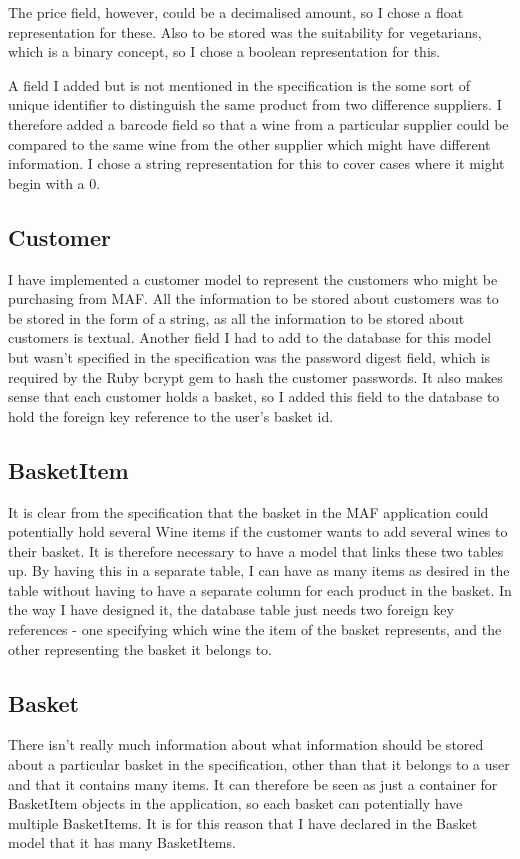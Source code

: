 \documentclass[a4paper,12pt,hidelinks]{report}
\begin{document}
    The price field, however, could be a decimalised amount, so I chose a float representation for these. Also to be stored was the suitability for vegetarians, which 
    is a binary concept, so I chose a boolean representation for this. 
    
    A field I added but is not mentioned in the specification is the some sort of unique identifier to distinguish the same product from
    two difference suppliers. I therefore added a barcode field so that a wine from a particular supplier could be compared to the same wine from the other
    supplier which might have different information. I chose a string representation for this to cover cases where it might begin with a 0.

    \subsection{Customer}
    I have implemented a customer model to represent the customers who might be purchasing from MAF. All the information to be stored about customers was
    to be stored in the form of a string, as all the information to be stored about customers is textual. Another field I had to add to the database for this
    model but wasn't specified in the specification was the password digest field, which is required by the Ruby bcrypt gem to hash the customer passwords.
    It also makes sense that each customer holds a basket, so I added this field to the database to hold the foreign key reference to the user's basket id.

    \subsection{BasketItem}
    It is clear from the specification that the basket in the MAF application could potentially hold several Wine items if the customer wants to add
    several wines to their basket. It is therefore necessary to have a model that links these two tables up. By having this in a separate table, I
    can have as many items as desired in the table without having to have a separate column for each product in the basket. In the way I have designed it,
    the database table just needs two foreign key references - one specifying which wine the item of the basket represents, and the other representing the
    basket it belongs to.

    \subsection{Basket}
    There isn't really much information about what information should be stored about a particular basket in the specification, other than that
    it belongs to a user and that it contains many items. It can therefore be seen as just a container for BasketItem objects in the application,
    so each basket can potentially have multiple BasketItems. It is for this reason that I have declared in the Basket model that it has many
    BasketItems.
\end{document}
